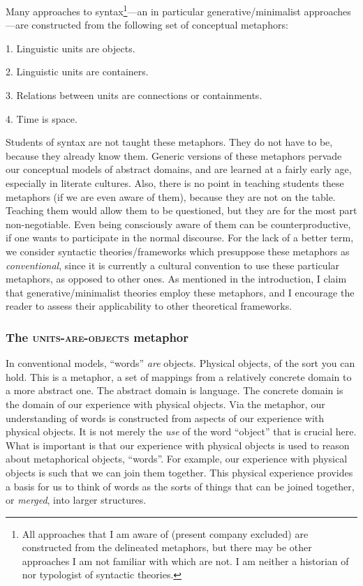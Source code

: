   Many approaches to syntax\footnote{All approaches that I am aware of (present company excluded) are constructed from the delineated metaphors, but there may be other approaches I am not familiar with which are not. I am neither a historian of nor typologist of syntactic theories.}—an in particular generative/minimalist approaches—are constructed from the following set of conceptual metaphors: 

1. Linguistic units are objects.

2. Linguistic units are containers.

3. Relations between units are connections or containments.

4. Time is space.

  Students of syntax are not taught these metaphors. They do not have to be, because they already know them. Generic versions of these metaphors pervade our conceptual models of abstract domains, and are learned at a fairly early age, especially in literate cultures. Also, there is no point in teaching students these metaphors (if we are even aware of them), because they are not on the table. Teaching them would allow them to be questioned, but they are for the most part non-negotiable. Even being consciously aware of them can be counterproductive, if one wants to participate in the normal discourse. For the lack of a better term, we consider syntactic theories/frameworks which presuppose these metaphors as \textit{conventional}, since it is currently a cultural convention to use these particular metaphors, as opposed to other ones. As mentioned in the introduction, I claim that generative/minimalist theories employ these metaphors, and I encourage the reader to assess their applicability to other theoretical frameworks.

\subsubsection{{The} {\textsc{units-}}{\textsc{are}}{\textsc{{}-objects}}{ metaphor}} 

In conventional models, “words” \textit{are} objects. Physical objects, of the sort you can hold. This is a metaphor, a set of mappings from a relatively concrete domain to a more abstract one. The abstract domain is language. The concrete domain is the domain of our experience with physical objects. Via the metaphor, our understanding of words is constructed from aspects of our experience with physical objects. It is not merely the \textit{use} of the word “object” that is crucial here. What is important is that our experience with physical objects is used to reason about metaphorical objects, “words”. For example, our experience with physical objects is such that we can join them together. This physical experience provides a basis for us to think of words as the sorts of things that can be joined together, or \textit{merged}, into larger structures.

